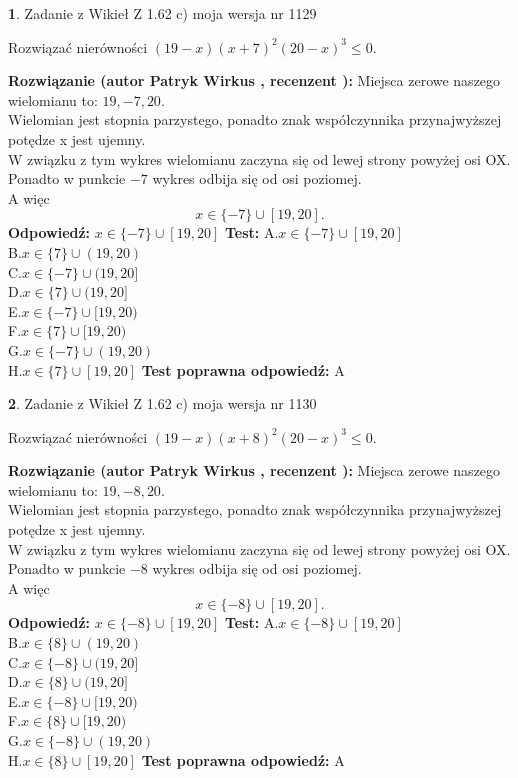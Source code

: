 \documentclass[12pt, a4paper]{article}
\theoremstyle{definition} %
\newtheorem{zad}{}
\newcommand{\zadStart}[1]{\begin{zad}#1\newline}
\newcommand{\zadStop}{\end{zad}}
\newcommand{\rozwStart}[2]{\noindent \textbf{Rozwiązanie (autor #1 , recenzent #2): }\newline}
\newcommand{\rozwStop}{\newline}
\newcommand{\odpStart}{\noindent \textbf{Odpowiedź:}\newline}
\newcommand{\odpStop}{\newline}
\newcommand{\testStart}{\noindent \textbf{Test:}\newline}
\newcommand{\testStop}{\newline}
\newcommand{\kluczStart}{\noindent \textbf{Test poprawna odpowiedź:}\newline}
\newcommand{\kluczStop}{\newline}
\begin{document}
\zadStart{Zadanie z Wikieł Z 1.62 c) moja wersja nr 1129}

Rozwiązać nierówności $(19-x)(x+7)^{2}(20-x)^{3}\le0$.
\zadStop
\rozwStart{Patryk Wirkus}{}
Miejsca zerowe naszego wielomianu to: $19, -7, 20$.\\
Wielomian jest stopnia parzystego, ponadto znak współczynnika przy\linebreak najwyższej potędze x jest ujemny.\\ W związku z tym wykres wielomianu zaczyna się od lewej strony powyżej osi OX.\\
Ponadto w punkcie $-7$ wykres odbija się od osi poziomej.\\
A więc $$x \in \{-7\} \cup [19,20].$$
\rozwStop
\odpStart
$x \in \{-7\} \cup [19,20]$
\odpStop
\testStart
A.$x \in \{-7\} \cup [19,20]$\\
B.$x \in \{7\} \cup (19,20)$\\
C.$x \in \{-7\} \cup (19,20]$\\
D.$x \in \{7\} \cup (19,20]$\\
E.$x \in \{-7\} \cup [19,20)$\\
F.$x \in \{7\} \cup [19,20)$\\
G.$x \in \{-7\} \cup (19,20)$\\
H.$x \in \{7\} \cup [19,20]$
\testStop
\kluczStart
A
\kluczStop



\zadStart{Zadanie z Wikieł Z 1.62 c) moja wersja nr 1130}

Rozwiązać nierówności $(19-x)(x+8)^{2}(20-x)^{3}\le0$.
\zadStop
\rozwStart{Patryk Wirkus}{}
Miejsca zerowe naszego wielomianu to: $19, -8, 20$.\\
Wielomian jest stopnia parzystego, ponadto znak współczynnika przy\linebreak najwyższej potędze x jest ujemny.\\ W związku z tym wykres wielomianu zaczyna się od lewej strony powyżej osi OX.\\
Ponadto w punkcie $-8$ wykres odbija się od osi poziomej.\\
A więc $$x \in \{-8\} \cup [19,20].$$
\rozwStop
\odpStart
$x \in \{-8\} \cup [19,20]$
\odpStop
\testStart
A.$x \in \{-8\} \cup [19,20]$\\
B.$x \in \{8\} \cup (19,20)$\\
C.$x \in \{-8\} \cup (19,20]$\\
D.$x \in \{8\} \cup (19,20]$\\
E.$x \in \{-8\} \cup [19,20)$\\
F.$x \in \{8\} \cup [19,20)$\\
G.$x \in \{-8\} \cup (19,20)$\\
H.$x \in \{8\} \cup [19,20]$
\testStop
\kluczStart
A
\kluczStop
\end{document}
